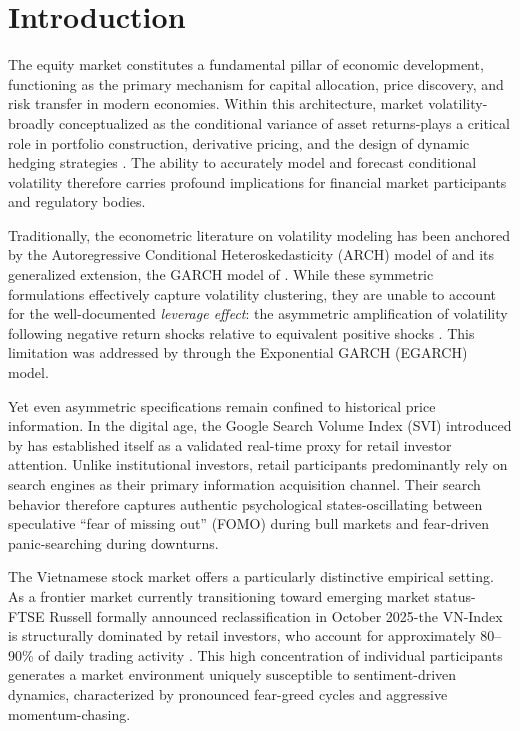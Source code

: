 \documentclass[12pt, a4paper]{article}
\begin{document}
\setcounter{page}{1}

\section{Introduction}

The equity market constitutes a fundamental pillar of economic development, functioning as the primary mechanism for capital allocation, price discovery, and risk transfer in modern economies. Within this architecture, market volatility-broadly conceptualized as the conditional variance of asset returns-plays a critical role in portfolio construction, derivative pricing, and the design of dynamic hedging strategies \citep{engle1982, bollerslev1986}. The ability to accurately model and forecast conditional volatility therefore carries profound implications for financial market participants and regulatory bodies.

Traditionally, the econometric literature on volatility modeling has been anchored by the Autoregressive Conditional Heteroskedasticity (ARCH) model of \citet{engle1982} and its generalized extension, the GARCH model of \citet{bollerslev1986}. While these symmetric formulations effectively capture volatility clustering, they are unable to account for the well-documented \textit{leverage effect}: the asymmetric amplification of volatility following negative return shocks relative to equivalent positive shocks \citep{black1976}. This limitation was addressed by \citet{nelson1991} through the Exponential GARCH (EGARCH) model.

Yet even asymmetric specifications remain confined to historical price information. In the digital age, the Google Search Volume Index (SVI) introduced by \citet{da2011} has established itself as a validated real-time proxy for retail investor attention. Unlike institutional investors, retail participants predominantly rely on search engines as their primary information acquisition channel. Their search behavior therefore captures authentic psychological states-oscillating between speculative ``fear of missing out'' (FOMO) during bull markets and fear-driven panic-searching during downturns.

The Vietnamese stock market offers a particularly distinctive empirical setting. As a frontier market currently transitioning toward emerging market status-FTSE Russell formally announced reclassification in October 2025-the VN-Index is structurally dominated by retail investors, who account for approximately 80–90\% of daily trading activity \citep{ayala2024}. This high concentration of individual participants generates a market environment uniquely susceptible to sentiment-driven dynamics, characterized by pronounced fear-greed cycles and aggressive momentum-chasing.
\end{document}
